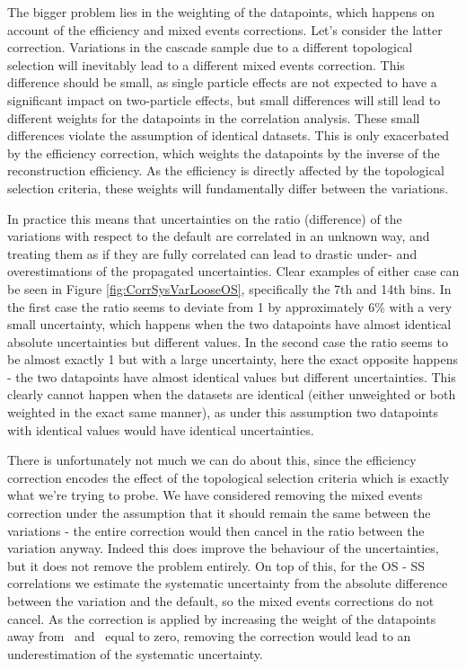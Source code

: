   The bigger problem lies in the weighting of the datapoints, which happens on account of the efficiency and mixed events corrections. Let's consider the latter correction. Variations in the cascade sample due to a different topological selection will inevitably lead to a different mixed events correction. This difference should be small, as single particle effects are not expected to have a significant impact on two-particle effects, but small differences will still lead to different weights for the datapoints in the correlation analysis. These small differences violate the assumption of identical datasets. This is only exacerbated by the efficiency correction, which weights the datapoints by the inverse of the reconstruction efficiency. As the efficiency is directly affected by the topological selection criteria, these weights will fundamentally differ between the variations. 

  In practice this means that uncertainties on the ratio (difference) of the variations with respect to the default are correlated in an unknown way, and treating them as if they are fully correlated can lead to drastic under- and overestimations of the propagated uncertainties. Clear examples of either case can be seen in Figure \ref{fig:CorrSysVarLooseOS}, specifically the 7th and 14th bins. In the first case the ratio seems to deviate from 1 by approximately 6\% with a very small uncertainty, which happens when the two datapoints have almost identical absolute uncertainties but different values. In the second case the ratio seems to be almost exactly 1 but with a large uncertainty, here the exact opposite happens - the two datapoints have almost identical values but different uncertainties. This clearly cannot happen when the datasets are identical (either unweighted or both weighted in the exact same manner), as under this assumption two datapoints with identical values would have identical uncertainties. 

  There is unfortunately not much we can do about this, since the efficiency correction encodes the effect of the topological selection criteria which is exactly what we're trying to probe. We have considered removing the mixed events correction under the assumption that it should remain the same between the variations - the entire correction would then cancel in the ratio between the variation anyway. Indeed this does improve the behaviour of the uncertainties, but it does not remove the problem entirely.  On top of this, for the OS - SS correlations we estimate the systematic uncertainty from the absolute difference between the variation and the default, so the mixed events corrections do not cancel. As the correction is applied by increasing the weight of the datapoints away from \dy\ and \dphi\ equal to zero, removing the correction would lead to an underestimation of the systematic uncertainty. 

